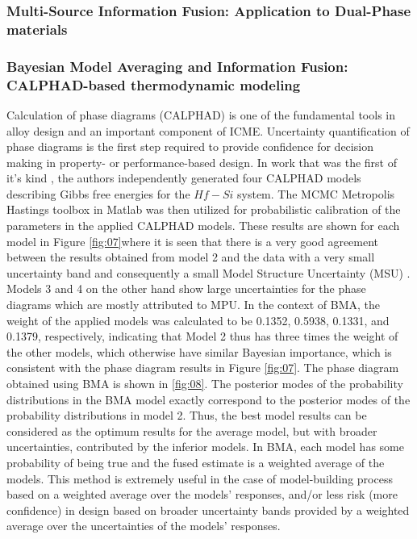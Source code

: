 \documentclass[utf8]{frontiersSCNS} %
\begin{document}
\subsubsection{ Multi-Source Information Fusion: Application to Dual-Phase materials}

\subsubsection{Bayesian Model Averaging and Information Fusion: CALPHAD-based thermodynamic modeling}
Calculation of phase diagrams (CALPHAD) is one of the fundamental tools in alloy design and an important component of ICME. Uncertainty quantification of phase diagrams is the first step required to provide confidence for decision making in property- or performance-based design. In work that was the first of it's kind \cite{honarmandi2019bayesian}, the authors independently generated four CALPHAD models describing Gibbs free energies for the $Hf-Si$ system. The MCMC Metropolis Hastings toolbox in Matlab was then utilized for probabilistic calibration of the parameters in the applied CALPHAD models. These results are shown for each model in Figure \ref{fig:07}where it is seen that there is a very good agreement between the results obtained from model 2 and the data with a very small uncertainty band and consequently a small Model Structure Uncertainty (MSU) \cite{choi2008inductive}. Models 3 and 4 on the other hand show large uncertainties for the phase diagrams which are mostly attributed to MPU. In the context of BMA, the weight of the applied models was
calculated to be 0.1352, 0.5938, 0.1331, and 0.1379, respectively, indicating that Model 2 thus has three times the weight of the other models, which otherwise have similar Bayesian importance, which is consistent with the phase diagram results in Figure \ref{fig:07}. The phase diagram obtained using BMA is shown in \ref{fig:08}. The posterior modes of the probability distributions in the BMA model exactly correspond to the posterior modes of the probability distributions in model 2. Thus, the best model results can be considered as the optimum results for the average model, but with broader uncertainties, contributed by the inferior models. In BMA, each model has some probability of being true and the fused estimate is a weighted average of the models. This method is extremely useful in the case of model-building process based on a weighted average over the models' responses, and/or less risk (more confidence) in design based on broader uncertainty bands provided by a weighted average over the uncertainties of the models’ responses.
\end{document}
